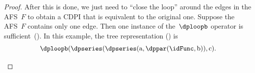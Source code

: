 \begin{proof}
After this is done, we just need to ``close the loop'' around the
edges in the AFS~$F$ to obtain a CDPI that is equivalent to the
original one. Suppose the AFS~$F$ contains only one edge. Then one
instance of the~$\dploopb$ operator is sufficient~().
In this example, the tree representation () is
\[
\dploopb(\dpseries(\dpseries(\text{a},\dppar(\idFunc,\text{b})),\text{c}).
\]

\begin{figure}[H]
\hfill{}\hfill{}\hfill{}


\end{figure}
\end{proof}
